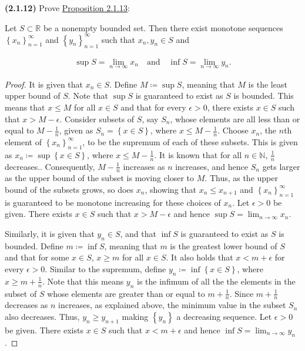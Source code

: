 \documentclass[12pt]{article}
\newcommand{\set}[1]{\left\{ {#1} \right\}}
\newcommand{\seq}[2][n]{\left\{ {#2} \right\}_{#1=1}^\infty}
\newcommand{\bR}{\mathbb{R}}
\newcommand{\bN}{\mathbb{N}}
\begin{document}
\newpage

\noindent \textbf{(2.1.12)} Prove \underline{Proposition 2.1.13}:

\indent Let $S\subset\bR$ be a nonempty bounded set. Then there exist monotone sequences $\set{x_n}_{n=1}^\infty$ and $\set{y_n}_{n=1}^\infty $ such that $x_n, y_n\in S$ and

\begin{align*}
	\sup S = \lim_{n\to\infty} x_n \quad \text{and} \quad \inf S = \lim_{n\to\infty} y_n.
\end{align*}

\begin{proof} It is given that $x_n\in S$. Define $M\coloneq \sup S$, meaning that $M$ is the least upper bound of $S$. Note that $\sup S$ is guaranteed to exist as $S$ is bounded. This means that $x\le M$ for all $x\in S$ and that for every $\epsilon > 0$, there exists $x\in S$ such that $x>M - \epsilon$. Consider subsets of $S$, say $S_n$, whose elements are all less than or equal to $M-\frac{1}{n}$, given as $S_n=\set{x\in S}$, where $x\le M-\frac{1}{n}$. Choose $x_n$, the $n$th element of $\seq{x_n}$, to be the supremum of each of these subsets. This is given as $x_n\coloneq\sup \set{x\in S}$, where $x\le M-\frac{1}{n}$. It is known that for all $n\in\bN$, $\frac{1}{n}$ decreases.. Consequently, $M-\frac{1}{n}$ increases as $n$ increases, and hence $S_n$ gets larger as the upper bound of the subset is moving closer to $M$. Thus, as the upper bound of the subsets grows, so does $x_n$, showing that $x_n \le x_{n+1}$ and $\seq{x_n}$ is guaranteed to be monotone increasing for these choices of $x_n$. Let $\epsilon > 0$ be given. There exists $x\in S$ such that $x>M-\epsilon$ and hence $\sup S = \lim_{n\to\infty} x_n$.

\indent Similarly, it is given that $y_n\in S$, and that $\inf S$ is guaranteed to exist as $S$ is bounded. Define $m\coloneq\inf S$, meaning that $m$ is the greatest lower bound of $S$ and that for some $x\in S$, $x\ge m$ for all $x\in S$. It also holds that $x<m+\epsilon$ for every $\epsilon > 0$. Similar to the supremum, define $y_n\coloneq\inf\set{x\in S}$, where $x\ge m+\frac{1}{n}$. Note that this means $y_n$ is the infimum of all the the elements in the subset of $S$ whose elements are greater than or equal to $m+\frac{1}{n}$. Since $m+\frac{1}{n}$ decreases as $n$ increases, as explained above, the minimum value in the subset $S_n$ also decreases. Thus, $y_n\ge y_{n+1}$ making $\set{y_n}$ a decreasing sequence. Let $\epsilon > 0$ be given. There exists $x\in S$ such that $x<m+\epsilon$ and hence $\inf S = \lim_{n\to\infty} y_n$.
\end{proof}
\end{document}

